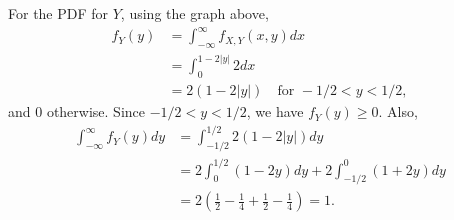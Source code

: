 \begin{exercise}
\begin{solution}
\begin{center}
            \end{center}

For the PDF  for $Y$,             using the graph above,
            \begin{align*}
                f_{Y}(y) &= \int_{-\infty}^{\infty}f_{X,Y}(x,y)dx\\
                & = \int_{0}^{1-2|y|}2dx\\
                & = 2(1-2|y|)\quad\text{for } -1/2< y< 1/2,
            \end{align*}
            and 0 otherwise.
            Since $-1/2< y< 1/2$, we have $f_{Y}(y)\geq 0$. Also,
            \begin{align*}
                \int_{-\infty}^{\infty}f_{Y}(y)dy &= \int_{-1/2}^{1/2}2(1-2|y|)dy\\
                &=2\int_{0}^{1/2}(1-2y)dy + 2\int_{-1/2}^{0}(1+2y)dy\\
                &=2\left(\frac{1}{2}-\frac{1}{4} +\frac{1}{2}-\frac{1}{4}\right) = 1.
            \end{align*}


\end{solution}
\end{exercise}
